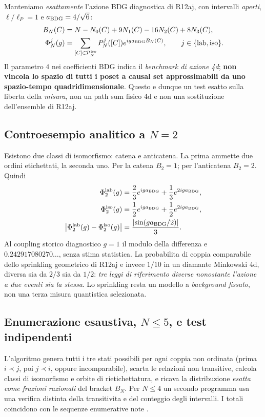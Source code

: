 \documentclass[11pt,a4paper]{article}
\begin{document}
Manteniamo \emph{esattamente} l'azione BDG diagnostica di R12aj, con intervalli \emph{aperti}, $\ell/\ell_P=1$ e $a_{\rm BDG}=4/\sqrt6$:
\begin{align}
 B_N(C)&=N-N_0(C)+9N_1(C)-16N_2(C)+8N_3(C),\\
 \Phi_N^{j}(g)&=\sum_{[C]\in\mathcal P_N^{\rm iso}}P_N^{j}([C])
 e^{i g a_{\rm BDG}B_N(C)},\qquad j\in\{\mathrm{lab},\mathrm{iso}\}.
 \label{eq:r12ak_amps}
\end{align}
Il parametro $4$ nei coefficienti BDG indica il \emph{benchmark di azione 4d}; \textbf{non vincola lo spazio di tutti i poset a causal set approssimabili da uno spazio-tempo quadridimensionale}. Questo e dunque un test esatto sulla liberta della \emph{misura}, non un path sum fisico 4d e non una sostituzione dell'ensemble di R12aj.

\subsection{Controesempio analitico a $N=2$}

Esistono due classi di isomorfismo: catena e anticatena. La prima ammette due ordini etichettati, la seconda uno. Per la catena $B_2=1$; per l'anticatena $B_2=2$. Quindi
\begin{align}
 \Phi_2^{\rm lab}(g)&=\frac23e^{iga_{\rm BDG}}+\frac13e^{2iga_{\rm BDG}},\\
 \Phi_2^{\rm iso}(g)&=\frac12e^{iga_{\rm BDG}}+\frac12e^{2iga_{\rm BDG}},\\
 \left|\Phi_2^{\rm lab}(g)-\Phi_2^{\rm iso}(g)\right|&=\frac{\left|\sin(ga_{\rm BDG}/2)\right|}{3}.
 \label{eq:r12ak_n2}
\end{align}
Al coupling storico diagnostico $g=1$ il modulo della differenza e $0.242917080270\ldots$, senza stima statistica. La probabilita di coppia comparabile dello sprinkling geometrico di R12aj e invece $1/10$ in un diamante Minkowski 4d, diversa sia da $2/3$ sia da $1/2$: \emph{tre leggi di riferimento diverse nonostante l'azione a due eventi sia la stessa}. Lo sprinkling resta un modello a \emph{background fissato}, non una terza misura quantistica selezionata.

\subsection{Enumerazione esaustiva, $N\le5$, e test indipendenti}

L'algoritmo genera tutti i tre stati possibili per ogni coppia non ordinata (prima $i\prec j$, poi $j\prec i$, oppure incomparabile), scarta le relazioni non transitive, calcola classi di isomorfismo e orbite di rietichettatura, e ricava la distribuzione \emph{esatta come frazioni razionali} del bracket $B_N$. Per $N\le4$ un secondo programma usa una verifica distinta della transitivita e del conteggio degli intervalli. I totali coincidono con le sequenze enumerative note \cite{OEISLabeledPosets,OEISUnlabeledPosets}.
\end{document}
